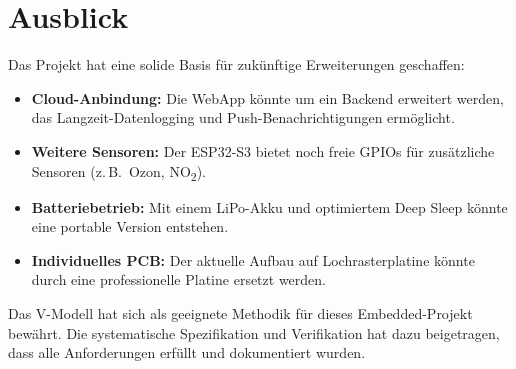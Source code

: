 \section{Ausblick}

Das Projekt hat eine solide Basis für zukünftige Erweiterungen geschaffen:

\begin{itemize}[nosep]
\item \textbf{Cloud-Anbindung:} Die WebApp könnte um ein Backend erweitert werden, das Langzeit-Datenlogging und Push-Benachrichtigungen ermöglicht.
\item \textbf{Weitere Sensoren:} Der ESP32-S3 bietet noch freie GPIOs für zusätzliche Sensoren (z.\,B.\ Ozon, NO\textsubscript{2}).
\item \textbf{Batteriebetrieb:} Mit einem LiPo-Akku und optimiertem Deep Sleep könnte eine portable Version entstehen.
\item \textbf{Individuelles PCB:} Der aktuelle Aufbau auf Lochrasterplatine könnte durch eine professionelle Platine ersetzt werden.
\end{itemize}

Das V-Modell hat sich als geeignete Methodik für dieses Embedded-Projekt bewährt. Die systematische Spezifikation und Verifikation hat dazu beigetragen, dass alle Anforderungen erfüllt und dokumentiert wurden.
